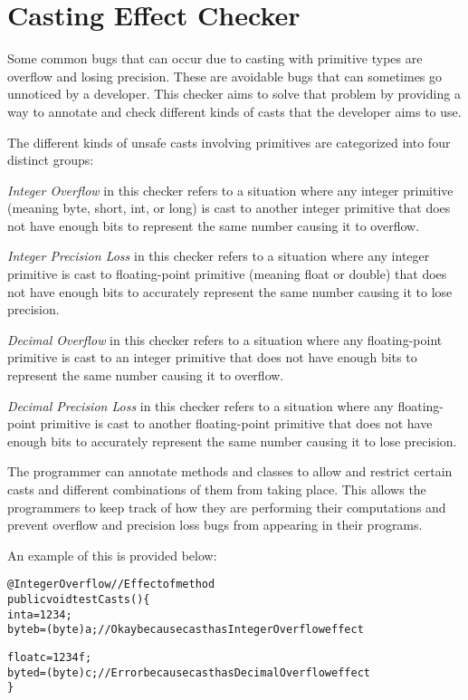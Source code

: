 \htmlhr
\chapter{Casting Effect Checker\label{castingeffect-checker}}

Some common bugs that can occur due to casting with primitive types are overflow and losing precision. These are avoidable bugs that can sometimes go unnoticed by a developer. This checker aims to solve that problem by providing a way to annotate and check different kinds of casts that the developer aims to use.

\noindent
The different kinds of unsafe casts involving primitives are categorized into four distinct groups:

\emph{Integer Overflow} in this checker refers to a situation where any integer primitive (meaning byte, short, int, or long) is cast to another integer primitive that does not have enough bits to represent the same number causing it to overflow.

\emph{Integer Precision Loss} in this checker refers to a situation where any integer primitive is cast to floating-point primitive (meaning float or double) that does not have enough bits to accurately represent the same number causing it to lose precision.

\emph{Decimal Overflow} in this checker refers to a situation where any floating-point primitive is cast to an integer primitive that does not have enough bits to represent the same number causing it to overflow.

\emph{Decimal Precision Loss} in this checker refers to a situation where any floating-point primitive is cast to another floating-point primitive that does not have enough bits to accurately represent the same number causing it to lose precision.

The programmer can annotate methods and classes to allow and restrict certain casts and different combinations of them from taking place. This allows the programmers to keep track of how they are performing their computations and prevent overflow and precision loss bugs from appearing in their programs.

\noindent
An example of this is provided below:

\begin{alltt}
@IntegerOverflow //Effect of method
public void testCasts() \{
    int a = 1234;
    byte b = (byte) a; //Okay because cast has IntegerOverflow effect
	
    float c = 1234f;
    byte d = (byte) c; //Error because cast has DecimalOverflow effect
\}
\end{alltt}

